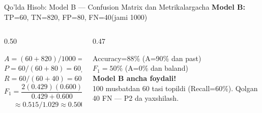 \documentclass[aspectratio=169,11pt]{beamer}
\begin{document}
\begin{frame}{Qo'lda Hisob: Model B --- Confusion Matrix dan Metrikalargacha}
  \small
  \textbf{Model B:}\;
  TP=60,\; TN=820,\; FP=80,\; FN=40\quad (jami 1000)
  \vspace{5pt}
  \begin{columns}[T]
    \begin{column}{0.50\textwidth}
      \begin{tcolorbox}[defbox,title=Hisoblar (qo'lda)]
        \small
        $A=(60+820)/1000=0.88$\\[4pt]
        $P=60/(60+80)=60/140\approx 0.429$\\[4pt]
        $R=60/(60+40)=60/100=0.600$\\[4pt]
        $F_1=\dfrac{2(0.429)(0.600)}{0.429+0.600}$\\[4pt]
        $\quad\;\approx 0.515/1.029\approx\mathbf{0.500}$
      \end{tcolorbox}
    \end{column}
    \begin{column}{0.47\textwidth}
      \begin{tcolorbox}[okbox,title=Xulosa]
        \small
        Accuracy=88\% (A=90\% dan past)\\[3pt]
        $F_1=50\%$ (A=0\% dan baland)\\[4pt]
        \textbf{Model B ancha foydali!}\\[4pt]
        \textcolor{halfgray}{\footnotesize
          100 musbatdan 60 tasi topildi (Recall=60\%).
          Qolgan 40 FN --- P2 da yaxshilash.}
      \end{tcolorbox}
    \end{column}
  \end{columns}
\end{frame}
\end{document}
